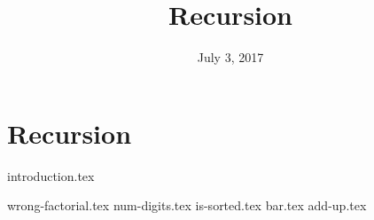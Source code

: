 \documentclass{exam}
\title{Recursion}
\date{July 3, 2017}
\begin{document}
\maketitle

\section{Recursion}
{introduction.tex}
\begin{questions}
{wrong-factorial.tex}
{num-digits.tex}
\clearpage
{is-sorted.tex}
{bar.tex}
\clearpage
{add-up.tex}
\end{questions}
\end{document}
